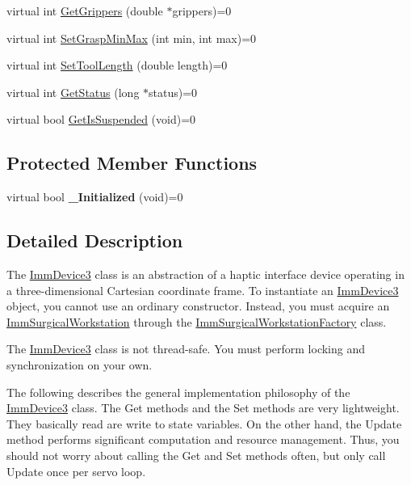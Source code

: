 \begin{DoxyCompactItemize}
\item 
virtual int \hyperlink{classImmDevice3_ad83c6941b396eb3e8f3acee9ed7dacfb}{GetGrippers} (double $\ast$grippers)=0
\item 
virtual int \hyperlink{classImmDevice3_a6755cfaeadbc6edb60a19cdf28defa1e}{SetGraspMinMax} (int min, int max)=0
\item 
virtual int \hyperlink{classImmDevice3_a1b48e98f281a0c887ece409e3a00b344}{SetToolLength} (double length)=0
\item 
virtual int \hyperlink{classImmDevice3_a59d37414c27386d0e5bd414de0ad3d3a}{GetStatus} (long $\ast$status)=0
\item 
virtual bool \hyperlink{classImmDevice3_a6540c9d22cde63911c3e0655a0e3c8ee}{GetIsSuspended} (void)=0
\end{DoxyCompactItemize}
\subsection*{Protected Member Functions}
\begin{DoxyCompactItemize}
\item 
\hypertarget{classImmDevice3_a05e7466117da704789850094315c1b0a}{
virtual bool {\bfseries \_\-Initialized} (void)=0}
\label{classImmDevice3_a05e7466117da704789850094315c1b0a}

\end{DoxyCompactItemize}


\subsection{Detailed Description}
The \hyperlink{classImmDevice3}{ImmDevice3} class is an abstraction of a haptic interface device operating in a three-\/dimensional Cartesian coordinate frame. To instantiate an \hyperlink{classImmDevice3}{ImmDevice3} object, you cannot use an ordinary constructor. Instead, you must acquire an \hyperlink{classImmSurgicalWorkstation}{ImmSurgicalWorkstation} through the \hyperlink{classImmSurgicalWorkstationFactory}{ImmSurgicalWorkstationFactory} class.

The \hyperlink{classImmDevice3}{ImmDevice3} class is not thread-\/safe. You must perform locking and synchronization on your own.

The following describes the general implementation philosophy of the \hyperlink{classImmDevice3}{ImmDevice3} class. The Get methods and the Set methods are very lightweight. They basically read are write to state variables. On the other hand, the Update method performs significant computation and resource management. Thus, you should not worry about calling the Get and Set methods often, but only call Update once per servo loop. 

